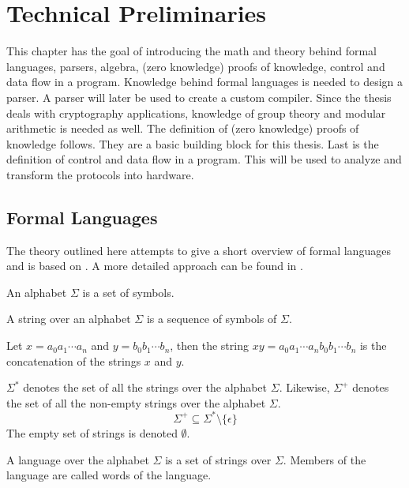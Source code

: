 \chapter{Technical Preliminaries}

This chapter has the goal of introducing the math and theory behind
formal languages, parsers, algebra, (zero knowledge) proofs of
knowledge, control and data flow in a program. Knowledge behind formal
languages is needed to design a parser. A parser will later be used to
create a custom compiler. Since the thesis deals with cryptography
applications, knowledge of group theory and modular arithmetic is
needed as well. The definition of (zero knowledge) proofs of knowledge
follows. They are a basic building block for this thesis. Last is the
definition of control and data flow in a program. This will be used to
analyze and transform the protocols into hardware.

\section{Formal Languages}

The theory outlined here attempts to give a short overview of
formal languages and is based on \cite{formal_languages}. A more
detailed approach can be found in \cite{Hopcroft}.

\begin{defn}[Alphabet]
  An alphabet $\Sigma$ is a set of symbols.
\end{defn}

\begin{defn}[String]
  A string over an alphabet $\Sigma$ is a sequence of symbols of $\Sigma$.
\end{defn}

\begin{defn}[Concatenation]
  Let $x = a_0 a_1 \dotsm a_n$ and $y = b_0 b_1 \dotsm b_n$, then the
  string $x y = a_0 a_1 \dotsm a_n b_0 b_1 \dotsm b_n$ is the
  concatenation of the strings $x$ and $y$.
\end{defn}

\begin{defn}[Sets]
  $\Sigma^*$ denotes the set of all the strings over the alphabet
  $\Sigma$. Likewise, $\Sigma^+$ denotes the set of all the non-empty
  strings over the alphabet $\Sigma$. $$\Sigma^+ \subseteq \Sigma^*
  \setminus \{ \epsilon \}$$ The empty set of strings is denoted
  $\emptyset$.
\end{defn}

\begin{defn}[Language]
  A language over the alphabet $\Sigma$ is a set of strings over
  $\Sigma$. Members of the language are called words of the language.
\end{defn}

